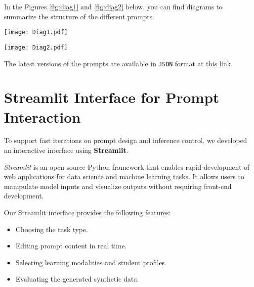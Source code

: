 In the Figures \ref{fig:diag1} and \ref{fig:diag2} below, you can find diagrams to summarize the structure of the different prompts.

\newpage
\begin{figure*}[h!]
	\center
	\texttt{[image: Diag1.pdf]}
  	\caption{Summary diagram for the Synthetic Data Generation prompt.}
  	\label{fig:diag1}
\end{figure*}

\vspace{1cm}

\begin{figure*}[h!]
	\center
	\texttt{[image: Diag2.pdf]}
  	\caption{Summary diagram for the Data Augmentation and Curriculum Pairs Generation prompts.}
  	\label{fig:diag2}
\end{figure*}

\vspace{1cm}
The latest versions of the prompts are available in \texttt{JSON} format at \href{https://github.com/JCHAVEROT/semester-project/tree/main/experiments/SyntheticData/prompts}{this link}.


\newpage

\section{Streamlit Interface for Prompt Interaction}

To support fast iterations on prompt design and inference control, we developed an interactive interface using \textbf{Streamlit}.

\textit{Streamlit} is an open-source Python framework that enables rapid development of web applications for data science and machine learning tasks. It allows users to manipulate model inputs and visualize outputs without requiring front-end development.

Our Streamlit interface provides the following features:
\begin{itemize}
	\item Choosing the task type.
	\item Editing prompt content in real time.
	\item Selecting learning modalities and student profiles.
	\item Evaluating the generated synthetic data.
\end{itemize}

